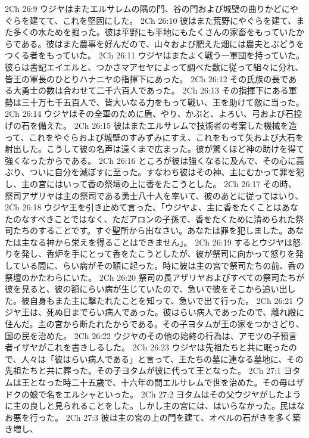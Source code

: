 2Ch 26:9  ウジヤはまたエルサレムの隅の門、谷の門および城壁の曲りかどにやぐらを建てて、これを堅固にした。
2Ch 26:10  彼はまた荒野にやぐらを建て、また多くの水ためを掘った。彼は平野にも平地にもたくさんの家畜をもっていたからである。彼はまた農事を好んだので、山々および肥えた畑には農夫とぶどうをつくる者をもっていた。
2Ch 26:11  ウジヤはまたよく戦う一軍団を持っていた。彼らは書記エイエルと、つかさマアセヤによって調べた数に従って組々に分れ、皆王の軍長のひとりハナニヤの指揮下にあった。
2Ch 26:12  その氏族の長である大勇士の数は合わせて二千六百人であった。
2Ch 26:13  その指揮下にある軍勢は三十万七千五百人で、皆大いなる力をもって戦い、王を助けて敵に当った。
2Ch 26:14  ウジヤはその全軍のために盾、やり、かぶと、よろい、弓および石投げの石を備えた。
2Ch 26:15  彼はまたエルサレムで技術者の考案した機械を造って、これをやぐらおよび城壁のすみずみにすえ、これをもって矢および大石を射出した。こうして彼の名声は遠くまで広まった。彼が驚くほど神の助けを得て強くなったからである。
2Ch 26:16  ところが彼は強くなるに及んで、その心に高ぶり、ついに自分を滅ぼすに至った。すなわち彼はその神、主にむかって罪を犯し、主の宮にはいって香の祭壇の上に香をたこうとした。
2Ch 26:17  その時、祭司アザリヤは主の祭司である勇士八十人を率いて、彼のあとに従ってはいり、
2Ch 26:18  ウジヤ王を引き止めて言った、「ウジヤよ、主に香をたくことはあなたのなすべきことではなく、ただアロンの子孫で、香をたくために清められた祭司たちのすることです。すぐ聖所から出なさい。あなたは罪を犯しました。あなたは主なる神から栄えを得ることはできません」。
2Ch 26:19  するとウジヤは怒りを発し、香炉を手にとって香をたこうとしたが、彼が祭司に向かって怒りを発している間に、らい病がその額に起った。時に彼は主の宮で祭司たちの前、香の祭壇のかたわらにいた。
2Ch 26:20  祭司の長アザリヤおよびすべての祭司たちが彼を見ると、彼の額にらい病が生じていたので、急いで彼をそこから追い出した。彼自身もまた主に撃たれたことを知って、急いで出て行った。
2Ch 26:21  ウジヤ王は、死ぬ日までらい病人であった。彼はらい病人であったので、離れ殿に住んだ。主の宮から断たれたからである。その子ヨタムが王の家をつかさどり、国の民を治めた。
2Ch 26:22  ウジヤのその他の始終の行為は、アモツの子預言者イザヤがこれを書きしるした。
2Ch 26:23  ウジヤは先祖たちと共に眠ったので、人々は「彼はらい病人である」と言って、王たちの墓に連なる墓地に、その先祖たちと共に葬った。その子ヨタムが彼に代って王となった。
2Ch 27:1  ヨタムは王となった時二十五歳で、十六年の間エルサレムで世を治めた。その母はザドクの娘で名をエルシャといった。
2Ch 27:2  ヨタムはその父ウジヤがしたように主の良しと見られることをした。しかし主の宮には、はいらなかった。民はなお悪を行った。
2Ch 27:3  彼は主の宮の上の門を建て、オペルの石がきを多く築き増し、
